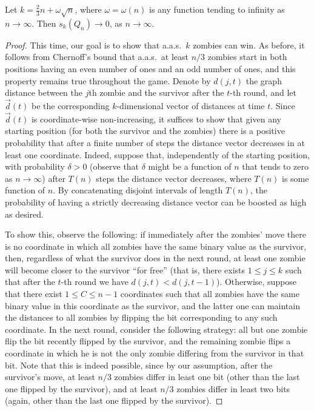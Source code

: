 \documentclass[12pt]{amsart}
\begin{document}
\begin{lemma}\label{lemm2}
Let $k = \frac 23 n + \omega \sqrt{n}$, where $\omega = \omega(n)$ is any function tending to infinity as $n\to \infty$. Then $s_k(Q_n) \to 0$, as $n \to \infty$.
\end{lemma}
\begin{proof}
This time, our goal is to show that a.a.s.\ $k$ zombies can win. As before, it follows from Chernoff's bound that a.a.s.\ at least $n/3$ zombies start in both positions having an even number of ones
and an odd number of ones, and this property remains true throughout the game. Denote by $d(j,t)$ the graph distance between the $j$th zombie and the survivor after the $t$-th round, and let
$\vec{d}(t)$ be the corresponding $k$-dimensional vector of distances at time $t$. Since $\vec{d}(t)$ is coordinate-wise non-increasing, it suffices to show that given any starting position (for both the survivor
and the zombies) there is a positive probability that after a finite number of steps the distance vector decreases in at least one coordinate. Indeed, suppose that, independently of the starting
position, with probability $\delta > 0$ (observe that $\delta$ might be a function of $n$ that tends to zero as $n \to \infty$) after $T(n)$ steps the distance vector decreases, where $T(n)$ is some function of $n$. By concatenating disjoint intervals of length $T(n)$, the probability
of having a strictly decreasing distance vector can be boosted as high as desired.

To show this, observe the following: if immediately after the zombies' move there is no coordinate in which all zombies have the same binary value as the survivor, then, regardless of what the survivor
does in the next round, at least one zombie will become closer to the survivor ``for free'' (that is, there exists $1 \leq j \leq k$ such that after the $t$-th round we have $d(j,t) < d(j,t-1)$).
Otherwise, suppose that there exist $1\le C \le n-1$ coordinates such that all zombies have the same binary value in this coordinate as the survivor, and the latter one can maintain the distances to all
zombies by flipping the bit corresponding to any such coordinate. In the next round, consider the following strategy: all but one zombie flip the bit recently flipped by the survivor, and the
remaining zombie flips a coordinate in which he is not the only zombie differing from the survivor in that bit. Note that this is indeed possible, since by our assumption, after the survivor's
move, at least $n/3$ zombies differ in least one bit (other than the last one flipped by the survivor), and at least $n/3$ zombies differ in least two bits (again, other than the last one flipped by
the survivor). 


\end{proof}
\end{document}
